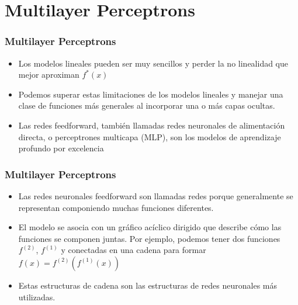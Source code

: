 \documentclass[
  shownotes,
  xcolor={svgnames},
  hyperref={colorlinks,citecolor=DarkBlue,linkcolor=DarkRed,urlcolor=DarkBlue}
  , aspectratio=169]{beamer}
\begin{document}
\section{Multilayer Perceptrons}
\begin{frame}
\frametitle{Multilayer Perceptrons}

\begin{itemize}
    \item Los modelos lineales pueden ser muy sencillos y perder la no linealidad que mejor aproximan $f^*(x)$
    \medskip
    \item Podemos superar estas limitaciones de los modelos lineales y manejar una clase de funciones más generales al incorporar una o más capas ocultas.
    \medskip
    \item Las redes feedforward, también llamadas redes neuronales de alimentación directa, o perceptrones multicapa (MLP), son los modelos de aprendizaje profundo por excelencia

\end{itemize}


\end{frame}

\begin{frame}
\frametitle{Multilayer Perceptrons}

\begin{itemize}
\item Las redes neuronales feedforward son llamadas redes porque  generalmente se representan componiendo muchas funciones diferentes. 
\medskip
\item El modelo se asocia con un gráfico acíclico dirigido que describe cómo las funciones se componen juntas. Por ejemplo, podemos tener dos funciones $f^{(2)}$, $f^{(1)}$ y conectadas en una cadena para formar $f(x)=f^{(2)}(f^{(1)}(x))$ 
\medskip
 \item Estas estructuras de cadena son las estructuras de redes neuronales más utilizadas.
\end{itemize}
\end{frame}
\end{document}
